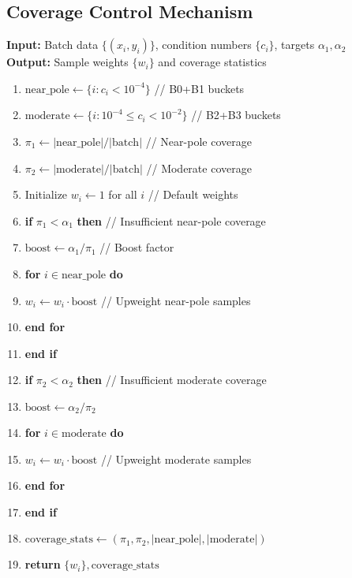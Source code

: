 \documentclass[twoside,11pt]{article}
\begin{document}
\subsection{Coverage Control Mechanism}

\begin{tcolorbox}[colback=gray!5!white,colframe=gray!75!black,title=\textbf{Algorithm 4: Coverage Control for Near-Pole Sampling}]
\textbf{Input:} Batch data $\{(x_i, y_i)\}$, condition numbers $\{c_i\}$, targets $\alpha_1, \alpha_2$ \\
\textbf{Output:} Sample weights $\{w_i\}$ and coverage statistics

\begin{enumerate}
\item $\text{near\_pole} \leftarrow \{i : c_i < 10^{-4}\}$ \hfill // B0+B1 buckets
\item $\text{moderate} \leftarrow \{i : 10^{-4} \leq c_i < 10^{-2}\}$ \hfill // B2+B3 buckets
\item $\pi_1 \leftarrow |\text{near\_pole}| / |\text{batch}|$ \hfill // Near-pole coverage
\item $\pi_2 \leftarrow |\text{moderate}| / |\text{batch}|$ \hfill // Moderate coverage
\item Initialize $w_i \leftarrow 1$ for all $i$ \hfill // Default weights
\item \textbf{if} $\pi_1 < \alpha_1$ \textbf{then} \hfill // Insufficient near-pole coverage
\item \quad $\text{boost} \leftarrow \alpha_1 / \pi_1$ \hfill // Boost factor
\item \quad \textbf{for} $i \in \text{near\_pole}$ \textbf{do}
\item \quad \quad $w_i \leftarrow w_i \cdot \text{boost}$ \hfill // Upweight near-pole samples
\item \quad \textbf{end for}
\item \textbf{end if}
\item \textbf{if} $\pi_2 < \alpha_2$ \textbf{then} \hfill // Insufficient moderate coverage
\item \quad $\text{boost} \leftarrow \alpha_2 / \pi_2$
\item \quad \textbf{for} $i \in \text{moderate}$ \textbf{do}
\item \quad \quad $w_i \leftarrow w_i \cdot \text{boost}$ \hfill // Upweight moderate samples
\item \quad \textbf{end for}
\item \textbf{end if}
\item $\text{coverage\_stats} \leftarrow (\pi_1, \pi_2, |\text{near\_pole}|, |\text{moderate}|)$
\item \textbf{return} $\{w_i\}, \text{coverage\_stats}$
\end{enumerate}
\end{tcolorbox}
\end{document}
